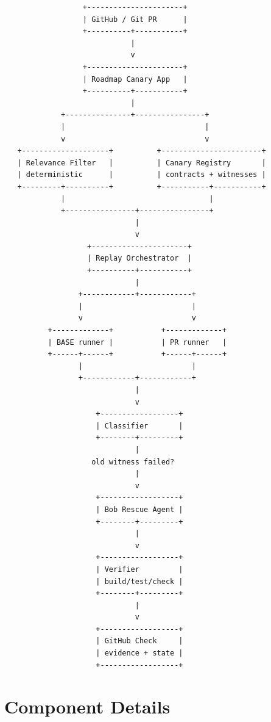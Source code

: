 \documentclass[12pt]{article}
\begin{document}
\begin{lstlisting}
                  +----------------------+
                  | GitHub / Git PR      |
                  +----------+-----------+
                             |
                             v
                  +----------------------+
                  | Roadmap Canary App   |
                  +----------+-----------+
                             |
             +---------------+----------------+
             |                                |
             v                                v
   +--------------------+          +-----------------------+
   | Relevance Filter   |          | Canary Registry       |
   | deterministic      |          | contracts + witnesses |
   +---------+----------+          +-----------+-----------+
             |                                 |
             +----------------+----------------+
                              |
                              v
                   +----------------------+
                   | Replay Orchestrator  |
                   +----------+-----------+
                              |
                 +------------+------------+
                 |                         |
                 v                         v
          +-------------+           +-------------+
          | BASE runner |           | PR runner   |
          +------+------+           +------+------+ 
                 |                         |
                 +------------+------------+
                              |
                              v
                     +------------------+
                     | Classifier       |
                     +--------+---------+
                              |
                    old witness failed?
                              |
                              v
                     +------------------+
                     | Bob Rescue Agent |
                     +--------+---------+
                              |
                              v
                     +------------------+
                     | Verifier         |
                     | build/test/check |
                     +--------+---------+
                              |
                              v
                     +------------------+
                     | GitHub Check     |
                     | evidence + state |
                     +------------------+
\end{lstlisting}

\section{Component Details}
\end{document}
